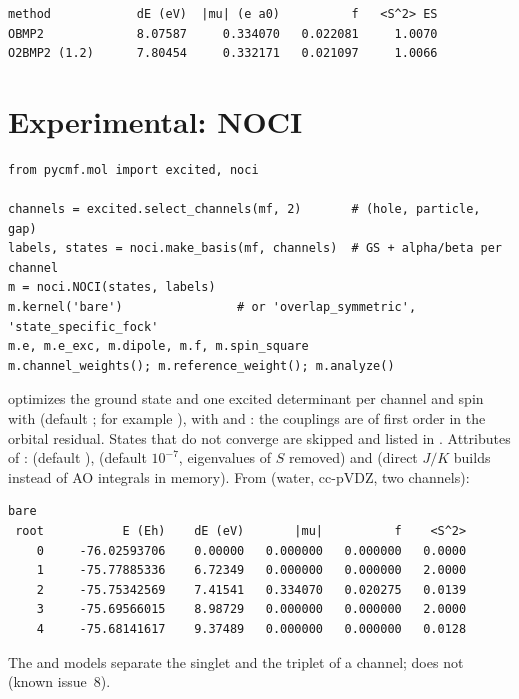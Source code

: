 \begin{lstlisting}[style=output]
method            dE (eV)  |mu| (e a0)          f   <S^2> ES
OBMP2             8.07587     0.334070   0.022081     1.0070
O2BMP2 (1.2)      7.80454     0.332171   0.021097     1.0066
\end{lstlisting}

\section{Experimental: NOCI}
\label{sec:noci}

\begin{lstlisting}[style=python]
from pycmf.mol import excited, noci

channels = excited.select_channels(mf, 2)       # (hole, particle, gap)
labels, states = noci.make_basis(mf, channels)  # GS + alpha/beta per channel
m = noci.NOCI(states, labels)
m.kernel('bare')                # or 'overlap_symmetric', 'state_specific_fock'
m.e, m.e_exc, m.dipole, m.f, m.spin_square
m.channel_weights(); m.reference_weight(); m.analyze()
\end{lstlisting}

 optimizes the ground state and one excited determinant per
channel and spin with  (default ; for example
), with 
and : the couplings are of first order in the orbital
residual. States that do not converge are skipped and listed in
. Attributes of : 
(default ),  (default $10^{-7}$,
eigenvalues of $S$ removed) and  (direct $J/K$ builds instead of
AO integrals in memory). From  (water,
cc-pVDZ, two channels):

\begin{lstlisting}[style=output]
bare
 root           E (Eh)    dE (eV)       |mu|          f    <S^2>
    0     -76.02593706    0.00000   0.000000   0.000000   0.0000
    1     -75.77885336    6.72349   0.000000   0.000000   2.0000
    2     -75.75342569    7.41541   0.334070   0.020275   0.0139
    3     -75.69566015    8.98729   0.000000   0.000000   2.0000
    4     -75.68141617    9.37489   0.000000   0.000000   0.0128
\end{lstlisting}

The  and  models separate the singlet and
the triplet of a channel;  does not (known
issue~8).

